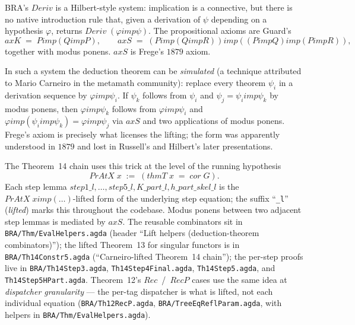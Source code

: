 \documentclass[11pt]{article}
\begin{document}
BRA's $\mathit{Deriv}$ is a Hilbert-style system: implication is a
connective, but there is no native introduction rule that, given a
derivation of $\psi$ depending on a hypothesis $\varphi$, returns
$\mathit{Deriv}\;(\varphi \mathrel{\mathit{imp}} \psi)$.  The propositional
axioms are Guard's
\[
  \mathit{axK} \;=\; P \mathrel{\mathit{imp}} (Q \mathrel{\mathit{imp}} P), \qquad
  \mathit{axS} \;=\; (P \mathrel{\mathit{imp}} (Q \mathrel{\mathit{imp}} R))
                       \mathrel{\mathit{imp}}
                       ((P \mathrel{\mathit{imp}} Q) \mathrel{\mathit{imp}} (P \mathrel{\mathit{imp}} R)),
\]
together with modus ponens.  $\mathit{axS}$ is Frege's $1879$ axiom.

In such a system the deduction theorem can be \emph{simulated} (a
technique attributed to Mario Carneiro in the metamath community):
replace every theorem $\psi_i$ in a derivation sequence by
$\varphi \mathrel{\mathit{imp}} \psi_i$.  If $\psi_k$ follows from $\psi_i$
and $\psi_j = \psi_i \mathrel{\mathit{imp}} \psi_k$ by modus ponens, then
$\varphi \mathrel{\mathit{imp}} \psi_k$ follows from
$\varphi \mathrel{\mathit{imp}} \psi_i$ and
$\varphi \mathrel{\mathit{imp}} (\psi_i \mathrel{\mathit{imp}} \psi_k)
 = \varphi \mathrel{\mathit{imp}} \psi_j$
via $\mathit{axS}$ and two applications of modus ponens.  Frege's
axiom is precisely what licenses the lifting; the form was apparently
understood in $1879$ and lost in Russell's and Hilbert's later
presentations.

The Theorem~14 chain uses this trick at the level of the running
hypothesis
\[
  \mathit{PrAtX}\;x \;:=\; (\mathit{thmT}\;x \;=\; \mathit{cor}\;G).
\]
Each step lemma $\mathit{step1\_l}, \dots, \mathit{step5\_l},
K\_\mathit{part}\_l, h\_\mathit{part}\_\mathit{skel}\_l$ is the
$\mathit{PrAtX}\;x \mathrel{\mathit{imp}} (\dots)$-lifted form of the
underlying step equation; the suffix ``\verb|_l|'' (\emph{lifted}) marks
this throughout the codebase.  Modus ponens between two adjacent step
lemmas is mediated by $\mathit{axS}$.  The reusable combinators sit in
\verb|BRA/Thm/EvalHelpers.agda| (header ``Lift helpers
(deduction-theorem combinators)''); the lifted Theorem~13 for singular
functors is in \verb|BRA/Th14Constr5.agda| (``Carneiro-lifted
Theorem~14 chain''); the per-step proofs live in
\verb|BRA/Th14Step3.agda|, \verb|Th14Step4Final.agda|,
\verb|Th14Step5.agda|, and \verb|Th14Step5HPart.agda|.  Theorem~12's
$\mathit{Rec}$~/~$\mathit{RecP}$ cases use the same idea at
\emph{dispatcher granularity} --- the per-tag dispatcher is what is
lifted, not each individual equation
(\verb|BRA/Th12RecP.agda|, \verb|BRA/TreeEqReflParam.agda|, with
helpers in \verb|BRA/Thm/EvalHelpers.agda|).
\end{document}
